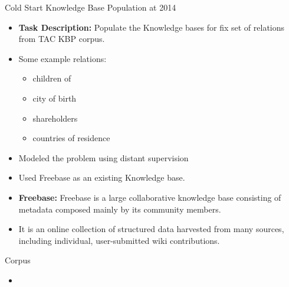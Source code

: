 \documentclass{beamer}
\begin{document}
\begin{frame}{Cold Start Knowledge Base Population at 2014}

\begin{itemize}
 \item \textbf{Task Description: } Populate the Knowledge bases for fix set of relations from TAC KBP corpus. \pause
 
 \item Some example relations:
    \begin{itemize}
      \item children of
      \item city of birth
      \item shareholders
      \item countries of residence
    \end{itemize}
\end{itemize}

\end{frame}

\begin{frame}

\begin{itemize}
  \item  Modeled the problem using distant supervision
  \item Used Freebase as an existing Knowledge base.
    
    \item \textbf{Freebase: }Freebase is a large collaborative knowledge base consisting of metadata composed mainly by its community members. 
    \item It is an online collection of structured data harvested from many sources, including individual, user-submitted wiki contributions.
 \end{itemize}

 
\end{frame}

\begin{frame}{Corpus}
 \begin{itemize}
  \item 
 \end{itemize}

 
\end{frame}
\end{document}
